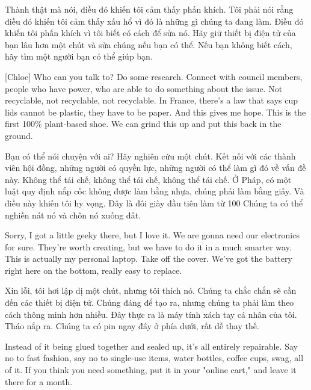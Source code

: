 \documentclass[a4paper]{article}
\begin{document}
	\begin{vietnamese-v2}
		Thành thật mà nói, điều đó khiến tôi cảm thấy phấn khích.
		Tôi phải nói rằng điều đó khiến tôi cảm thấy xấu hổ vì đó là những gì chúng ta đang làm.
		Điều đó khiến tôi phấn khích vì tôi biết có cách để sửa nó.
		Hãy giữ thiết bị điện tử của bạn lâu hơn một chút và sửa chúng nếu bạn có thể.
		Nếu bạn không biết cách, hãy tìm một người bạn có thể giúp bạn.
	\end{vietnamese-v2}
	
	[Chloe] Who can you talk to? Do some research.
	Connect with council members, people who have power, who are able to do something about the issue.
	Not recyclable, not recyclable, not recyclable.
	In France, there's a law that says cup lids cannot be plastic, they have to be paper.
	And this gives me hope.
	This is the first 100\% plant-based shoe.
	We can grind this up and put this back in the ground.
	
	\begin{vietnamese-v2}
		[Chloe] Bạn có thể nói chuyện với ai? Hãy nghiên cứu một chút.
		Kết nối với các thành viên hội đồng, những người có quyền lực, những người có thể làm gì đó về vấn đề này.
		Không thể tái chế, không thể tái chế, không thể tái chế.
		Ở Pháp, có một luật quy định nắp cốc không được làm bằng nhựa, chúng phải làm bằng giấy.
		Và điều này khiến tôi hy vọng.
		Đây là đôi giày đầu tiên làm từ 100%
		Chúng ta có thể nghiền nát nó và chôn nó xuống đất.
	\end{vietnamese-v2}
	
	
	Sorry, I got a little geeky there, but I love it.
	We are gonna need our electronics for sure.
	They're worth creating, but we have to do it in a much smarter way.
	This is actually my personal laptop.
	Take off the cover.
	We've got the battery right here on the bottom, really easy to replace.
	
	\begin{vietnamese-v2}
		Xin lỗi, tôi hơi lập dị một chút, nhưng tôi thích nó.
		Chúng ta chắc chắn sẽ cần đến các thiết bị điện tử.
		Chúng đáng để tạo ra, nhưng chúng ta phải làm theo cách thông minh hơn nhiều.
		Đây thực ra là máy tính xách tay cá nhân của tôi.
		Tháo nắp ra.
		Chúng ta có pin ngay đây ở phía dưới, rất dễ thay thế.
	\end{vietnamese-v2}
	
	Instead of it being glued together and sealed up, it's all entirely repairable.
	Say no to fast fashion, say no to single-use items, water bottles, coffee cups, swag, all of it.
	If you think you need something, put it in your "online cart," and leave it there for a month.
	
\end{document}
